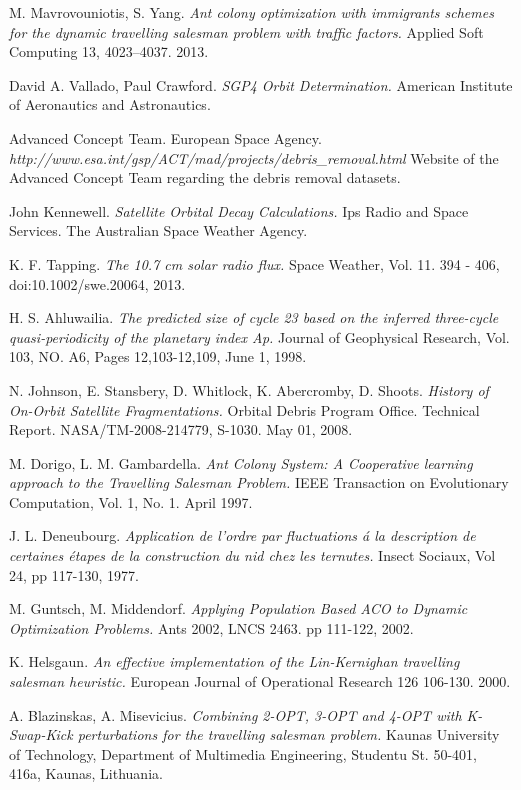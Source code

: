 \documentclass[a4paper,9pt,journal,twoside,compsoc]{PPIEEEtran}
\begin{document}
\begin{thebibliography}{9}
M. Mavrovouniotis, S. Yang.
\textit{Ant colony optimization with immigrants schemes for the dynamic travelling salesman problem with traffic factors.}
Applied Soft Computing 13, 4023–4037. 2013.

David A. Vallado, Paul Crawford.
\textit{SGP4 Orbit Determination.}
American Institute of Aeronautics and Astronautics.

Advanced Concept Team. European Space Agency.
\textit{http://www.esa.int/gsp/ACT/mad/projects/debris\_removal.html}
Website of the Advanced Concept Team regarding the debris removal datasets.

John Kennewell.
\textit{Satellite Orbital Decay Calculations.}
Ips Radio and Space Services. The Australian Space Weather Agency.

K. F. Tapping.
\textit{The 10.7 cm solar radio flux.}
Space Weather, Vol. 11. 394 - 406, doi:10.1002/swe.20064, 2013. 

H. S. Ahluwailia.
\textit{The predicted size of cycle 23 based on the inferred three-cycle quasi-periodicity of the planetary index Ap.}
Journal of Geophysical Research, Vol. 103, NO. A6, Pages 12,103-12,109, June 1, 1998.

N. Johnson, E. Stansbery, D. Whitlock, K. Abercromby, D. Shoots.
\textit{History of On-Orbit Satellite Fragmentations.}
Orbital Debris Program Office. Technical Report. NASA/TM-2008-214779, S-1030. May 01, 2008.

M. Dorigo, L. M. Gambardella.
\textit{Ant Colony System: A Cooperative learning approach to the Travelling Salesman Problem.}
IEEE Transaction on Evolutionary Computation, Vol. 1, No. 1. April 1997.

J. L. Deneubourg.
\textit{Application de l'ordre par fluctuations á la description de certaines étapes de la construction du nid chez les ternutes.}
Insect Sociaux, Vol 24, pp 117-130, 1977.

M. Guntsch, M. Middendorf.
\textit{Applying Population Based ACO to Dynamic Optimization Problems.}
Ants 2002, LNCS 2463. pp 111-122, 2002.

K. Helsgaun.
\textit{An effective implementation of the Lin-Kernighan travelling salesman heuristic.}
European Journal of Operational Research 126 106-130. 2000.

A. Blazinskas, A. Misevicius.
\textit{Combining 2-OPT, 3-OPT and 4-OPT with K-Swap-Kick perturbations for the travelling salesman problem.}
Kaunas University of Technology, Department of Multimedia Engineering, Studentu St. 50-401, 416a, Kaunas, Lithuania. 


\end{thebibliography}
\end{document}
